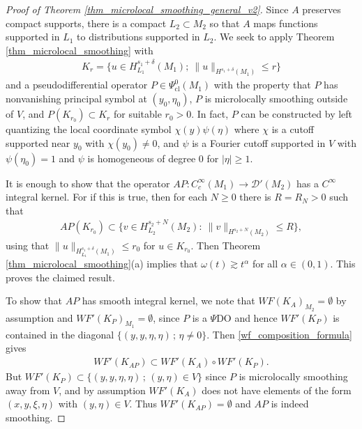 \documentclass[12pt,twoside]{amsart}
\numberwithin{equation}{section}
\renewcommand{\leq}{\leqslant}
\renewcommand{\geq}{\geqslant}
\newcommand{\abs}[1]{\lvert #1 \rvert}          %
\begin{document}
\begin{proof}[Proof of Theorem \ref{thm_microlocal_smoothing_general_v2}]
Since $A$ preserves compact supports, there is a compact $L_2 \subset M_2$ so that $A$ maps functions supported in $L_1$ to distributions supported in $L_2$. We seek to apply Theorem \ref{thm_microlocal_smoothing} with 
\begin{align*}
K_r = \{ u \in H^{s_1+\delta}_{L_1}(M_1); \ \|u\|_{H^{s_1+\delta}(M_1)}\leq r\}
\end{align*}
and a pseudodifferential operator $P \in \Psi^0_{\mathrm{cl}}(M_1)$ with the property that $P$ has nonvanishing principal symbol at $(y_0, \eta_0)$, $P$ is microlocally smoothing outside of $V$, and $P(K_{r_0}) \subset K_r$ for suitable $r_0 > 0$. In fact, $P$ can be constructed by left quantizing the local coordinate symbol $\chi(y) \psi(\eta)$ where $\chi$ is a cutoff supported near $y_0$ with $\chi(y_0) \neq 0$, and $\psi$ is a Fourier cutoff supported in $V$ with $\psi(\eta_0) = 1$ and $\psi$ is homogeneous of degree $0$ for $\abs{\eta} \geq 1$.

It is enough to show that the operator $AP: C^{\infty}_c(M_1) \to \mathcal{D}'(M_2)$ has a $C^{\infty}$ integral kernel. For if this is true, then for each $N \geq 0$ there is $R=R_N>0$ such that
\begin{align} \label{eq:map1}
AP(K_{r_0})\subset \{ v \in H^{s_2 + N}_{L_2}(M_2): \ \|v\|_{H^{s_2 + N}(M_2)}\leq R\},
\end{align}
using that $\|u\|_{H^{s_1+\delta}_{L_1}(M_1)}\leq r_0$ for $u \in K_{r_0}$. Then Theorem \ref{thm_microlocal_smoothing}(a) implies that $\omega(t) \gtrsim t^{\alpha}$ for all $\alpha \in (0,1)$. This proves the claimed result.

To show that $AP$ has smooth integral kernel, we note that $WF(K_A)_{M_2} = \emptyset$ by assumption and $WF'(K_P)_{M_1} = \emptyset$, since $P$ is a $\Psi$DO and hence $WF'(K_P)$ is contained in the diagonal $\{ (y,y,\eta,\eta) \,;\, \eta \neq 0 \}$. Then \eqref{wf_composition_formula} gives 
\begin{align}
\label{eq:WF_set_comp}
WF'(K_{AP}) \subset WF'(K_A) \circ WF'(K_P).
\end{align}
But $WF'(K_P) \subset \{ (y,y,\eta,\eta) \,;\, (y,\eta) \in V \}$ since $P$ is microlocally smoothing away from $V$, and by assumption $WF'(K_A)$ does not have elements of the form $(x,y,\xi,\eta)$ with $(y,\eta) \in V$. Thus $WF'(K_{AP}) = \emptyset$ and $AP$ is indeed smoothing.
\end{proof}
\end{document}
